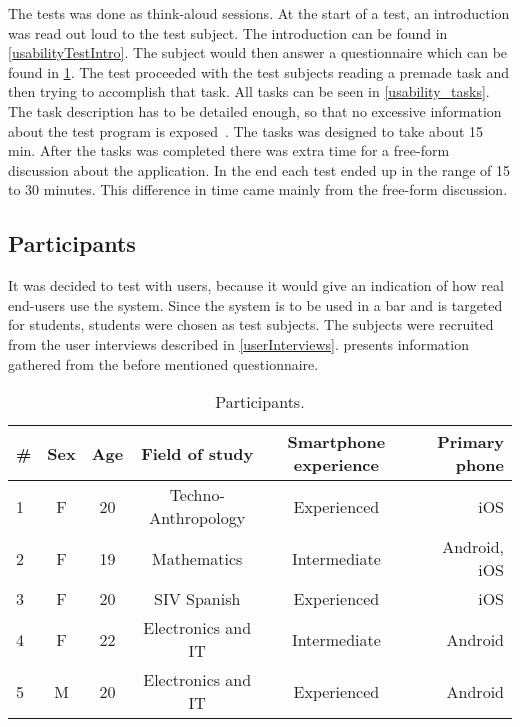 The tests was done as think-aloud sessions. At the start of a test, an introduction was read out loud to the test
subject. The introduction can be found in
\cref{usabilityTestIntro}. The subject would then answer a
questionnaire which can be found in \cref{tab:participants}. The test
proceeded with the test subjects reading a premade task and then
trying to accomplish that task. All tasks can be seen in \cref{usability_tasks}. The task description has to be detailed enough, so that no excessive information about the test program is exposed~\cite{RubinChisnellSpool08}. The tasks was designed to take about 15 min. After the tasks was completed there was extra time for a free-form discussion about the application. In the end each test ended up in the range of 15 to 30 minutes. This difference in time came mainly from the free-form discussion.

\subsection{Participants}
It was decided to test with users, because it would give an indication
of how real end-users use the system. Since the system is to be used
in a bar and is targeted for students, students were chosen as test
subjects. The subjects were recruited from the user interviews
described in \cref{userInterviews}.  presents
information gathered from the before mentioned questionnaire.

\begin{table}[hbtp]
    \centering
    \tabcolsep=0.10cm
    \begin{tabular}{lccccr}
        \toprule
        \textbf{\#} & \textbf{Sex} & \textbf{Age} & \textbf{Field of study} &
        \textbf{Smartphone experience} & \textbf{Primary phone} \\
        \midrule
        1                   & F               & 20           & Techno-Anthropology       & Experienced                    & iOS                    \\
        2                   & F               & 19           & Mathematics             & Intermediate                   & Android, iOS           \\
        3                   & F               & 20           & SIV Spanish             & Experienced                    & iOS                    \\
        4                   & F               & 22           & Electronics and IT      & Intermediate                   & Android                \\
        5                   & M               & 20           & Electronics and
        IT      & Experienced                    & Android                \\
        \bottomrule
    \end{tabular}
    \caption{Participants.}\label{tab:participants}
\end{table}

